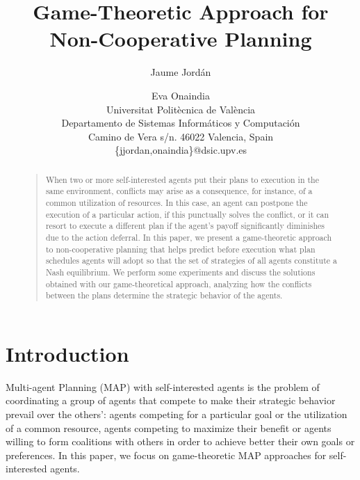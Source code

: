 \documentclass[letterpaper]{article}
\begin{document}
\title{Game-Theoretic Approach for Non-Cooperative Planning}
\author{ %
Jaume Jord\'{a}n \and Eva Onaindia\\
Universitat Polit\`{e}cnica de Val\`{e}ncia\\
Departamento de Sistemas Inform\'{a}ticos y Computaci\'{o}n\\
Camino de Vera s/n. 46022 Valencia, Spain\\
\{jjordan,onaindia\}@dsic.upv.es
}
\maketitle
\begin{abstract}
\begin{quote}

When two or more self-interested agents put their plans to execution in the same environment, conflicts may arise as a consequence, for instance, of a common utilization of resources. In this case, an agent can postpone the execution of a particular action, if this punctually solves the conflict, or it can resort to execute a different plan if the agent's payoff significantly diminishes due to the action deferral. In this paper, we present a game-theoretic approach to non-cooperative planning that helps predict before execution what plan schedules agents will adopt so that the set of strategies of all agents constitute a Nash equilibrium. We perform some experiments and discuss the solutions obtained with our game-theoretical approach, analyzing how the conflicts between the plans determine the strategic behavior of the agents.

\end{quote}
\end{abstract}



\section{Introduction}


Multi-agent Planning (MAP) with self-interested agents is the problem of coordinating a group of agents that compete to make their strategic behavior prevail over the others': agents competing for a particular goal or the utilization of a common resource, agents competing to maximize their benefit or agents willing to form coalitions with others in order to achieve better their own goals or preferences. In this paper, we focus on game-theoretic MAP approaches for self-interested agents.
\end{document}
